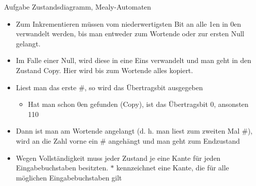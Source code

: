     \begin{frame}[allowframebreaks]{Aufgabe \thesection}{Zustandsdiagramm, Mealy-Automaten}
      \begin{solution}
        \begin{itemize}
          \item Zum Inkrementieren müssen vom niederwertigsten Bit an alle 1en in 0en verwandelt werden, bis man entweder zum Wortende oder zur ersten Null gelangt. 
          \item Im Falle einer Null, wird diese in eine Eins verwandelt und man geht in den Zustand Copy. Hier wird bis zum Wortende alles kopiert. 
          \item Liest man das erste \#, so wird das Übertragsbit ausgegeben
          \begin{itemize}
            \item Hat man schon 0en gefunden (Copy), ist das Übertragsbit 0, ansonsten 110
          \end{itemize}
        \item Dann ist man am Wortende angelangt (d. h. man liest zum zweiten Mal \#), wird an die Zahl vorne ein \# angehängt und man geht zum Endzustand
        \item Wegen Vollständigkeit muss jeder Zustand je eine Kante für jeden Eingabebuchstaben besitzten. $*$ kennzeichnet eine Kante, die für alle möglichen Eingabebuchstaben gilt
        \end{itemize}
      \end{solution}
    \end{frame}


